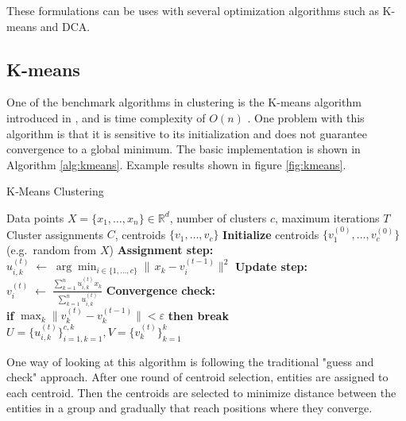 \noindent These formulations can be uses with several optimization algorithms such as K-means and DCA.


\subsection{K-means}
One of the benchmark algorithms in clustering is the K-means algorithm introduced in \cite{macqueen_methods_1967}, and is time complexity of \(O(n)\) \cite{jain_data_1999}. One problem with this algorithm is that it is sensitive to its initialization and does not guarantee convergence to a global minimum. The basic implementation is shown in Algorithm \ref{alg:kmeans}. Example results shown in figure \ref{fig:kmeans}.



\begin{algorithm}[ht]
\caption{K‐Means Clustering}
\label{alg:kmeans}
\begin{algorithmic}[1]
\REQUIRE Data points $X = \{x_1, \ldots, x_n\}\in\mathbb{R}^d$, number of clusters $c$, maximum iterations $T$
\ENSURE Cluster assignments $C$, centroids $\{v_1,\dots,v_c\}$
\STATE \textbf{Initialize} centroids $\{v_1^{(0)},\dots,v_c^{(0)}\}$ (e.g.\ random from $X$)
  \STATE \textbf{Assignment step:}
    \STATE $u_{i,k}^{(t)} \;\leftarrow\; \arg\min_{i\in\{1,\dots,c\}}\|\,x_k - v_i^{(t-1)}\|^2$
  \ENDFOR
  \STATE \textbf{Update step:}
    \STATE $\displaystyle v_i^{(t)} 
      \;\leftarrow\; 
      \frac{\sum_{k=1}^nu_{i,k}^{(t)}x_k}{\sum_{k=1}^nu_{i,k}^{(t)}}$
  \ENDFOR
  \STATE \textbf{Convergence check:} \\
    \hspace*{1em} \textbf{if} $\max_k \|v_k^{(t)} - v_k^{(t-1)}\| < \varepsilon$ \textbf{then break}
\ENDFOR
\RETURN $U = \{u_{i,k}^{(t)}\}_{i=1,k=1}^{c,k} ,V =\{v_k^{(t)}\}_{k=1}^k$
\end{algorithmic}
\end{algorithm}
One way of looking at this algorithm is following the traditional "guess and check" approach. After one round of centroid selection, entities are assigned to each centroid. Then the centroids are selected to minimize distance between the entities in a group and gradually that reach positions where they converge. 

